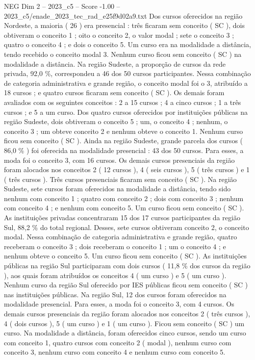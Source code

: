 \begin{textsample}{NEG Dim 2 – 2023\_c5 – Score -1.00 – 2023\_c5/enade\_2023\_tec\_rad\_e25f9d02a9.txt}
Dos cursos oferecidos na região Nordeste, a maioria ( 26 ) era presencial : três ficaram sem conceito ( SC ), dois obtiveram o conceito 1 ; oito o conceito 2, o valor modal ; sete o conceito 3 ; quatro o conceito 4 ; e dois o conceito 5.
Um curso era na modalidade a distância, tendo recebido o conceito modal 3.
Nenhum curso ficou sem conceito ( SC ) na modalidade a distância.
Na região Sudeste, a proporção de cursos da rede privada, 92,0 \%, correspondeu a 46 dos 50 cursos participantes.
Nessa combinação de categoria administrativa e grande região, o conceito modal foi o 3, atribuído a 18 cursos ; e quatro cursos ficaram sem conceito ( SC ).
Os demais foram avaliados com os seguintes conceitos : 2 a 15 cursos ; 4 a cinco cursos ; 1 a três cursos ; e 5 a um curso.
Dos quatro cursos oferecidos por instituições públicas na região Sudeste, dois obtiveram o conceito 5 ; um, o conceito 4 ; nenhum, o conceito 3 ; um obteve conceito 2 e nenhum obteve o conceito 1.
Nenhum curso ficou sem conceito ( SC ).
Ainda na região Sudeste, grande parcela dos cursos ( 86,0 \% ) foi oferecida na modalidade presencial : 43 dos 50 cursos.
Para esses, a moda foi o conceito 3, com 16 cursos.
Os demais cursos presenciais da região foram alocados nos conceitos 2 ( 12 cursos ), 4 ( seis cursos ), 5 ( três cursos ) e 1 ( três cursos ).
Três cursos presenciais ficaram sem conceito ( SC ).
Na região Sudeste, sete cursos foram oferecidos na modalidade a distância, tendo sido nenhum com conceito 1 ; quatro com conceito 2 ; dois com conceito 3 ; nenhum com conceito 4 ; e nenhum com conceito 5.
Um curso ficou sem conceito ( SC ).
As instituições privadas concentraram 15 dos 17 cursos participantes da região Sul, 88,2 \% do total regional.
Desses, sete cursos obtiveram conceito 2, o conceito modal.
Nessa combinação de categoria administrativa e grande região, quatro receberam o conceito 3 ; dois receberam o conceito 1 ; um o conceito 4 ; e nenhum obteve o conceito 5.
Um curso ficou sem conceito ( SC ).
As instituições públicas na região Sul participaram com dois cursos ( 11,8 \% dos cursos da região ), aos quais foram atribuídos os conceitos 4 ( um curso ) e 5 ( um curso ).
Nenhum curso da região Sul oferecido por IES públicas ficou sem conceito ( SC ) nas instituições públicas.
Na região Sul, 12 dos cursos foram oferecidos na modalidade presencial.
Para esses, a moda foi o conceito 3, com 4 cursos.
Os demais cursos presenciais da região foram alocados nos conceitos 2 ( três cursos ), 4 ( dois cursos ), 5 ( um curso ) e 1 ( um curso ).
Ficou sem conceito ( SC ) um curso.
Na modalidade a distância, foram oferecidos cinco cursos, sendo um curso com conceito 1, quatro cursos com conceito 2 ( modal ), nenhum curso com conceito 3, nenhum curso com conceito 4 e nenhum curso com conceito 5.

\end{textsample}
